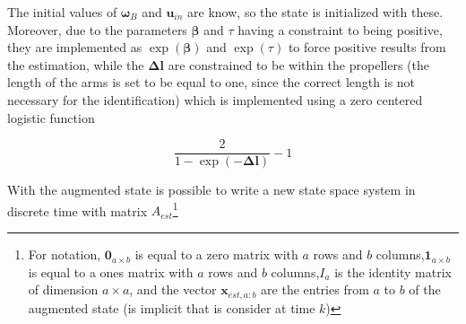 \noindent The initial values of $\boldsymbol{\omega}_B$ and $\mathbf{u}_{in}$ are know, so the state is initialized with these. Moreover, due to the parameters $\boldsymbol{\beta}$ and $\tau$ having a constraint to being positive, they are implemented as $\exp(\boldsymbol{\beta})$ and $\exp(\tau)$ to force positive results from the estimation, while the $\boldsymbol{\Delta l}$ are constrained to be within the propellers (the length of the arms is set to be equal to one, since the correct length is not necessary for the identification) which is implemented using a zero centered logistic function

\begin{equation}
	\frac{2}{1-\exp(-\boldsymbol{\Delta l})} -1
	\label{eq:logisticFunction}
\end{equation}

\noindent With the augmented state is possible to write a new state space system in discrete time with matrix $A_{est}$\footnote{For notation, $\mathbf{0}_{a\times b}$ is equal to a zero matrix with $a$ rows and $b$ columns,$\mathbf{1}_{a\times b}$ is equal to a ones matrix with $a$ rows and $b$ columns,$I_a$ is the identity matrix of dimension $a\times a$, and the vector $\mathbf{x}_{est,a:b}$ are the entries from $a$ to $b$ of the augmented state (is implicit that is consider at time $k$)}

